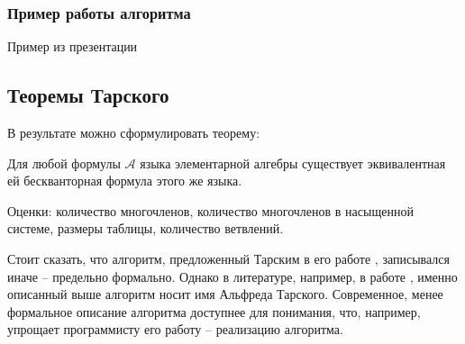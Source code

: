 \subsubsection{Пример работы алгоритма}
Пример из презентации

\subsection{Теоремы Тарского}
В результате можно сформулировать теорему:

\begin{theorem}
    Для любой формулы $\mathcal{A}$ языка элементарной алгебры существует эквивалентная ей бескванторная формула этого же языка.
\end{theorem}


Оценки: количество многочленов, количество многочленов в насыщенной системе, размеры таблицы, количество ветвлений.





Стоит сказать, что алгоритм, предложенный Тарским в его работе \cite{Tarski}, записывался иначе -- предельно формально. Однако в литературе, например, в работе \cite{Matiyasevich}, именно описанный выше алгоритм носит имя Альфреда Тарского. Современное, менее формальное описание алгоритма доступнее для понимания, что, например, упрощает программисту его работу -- реализацию алгоритма.